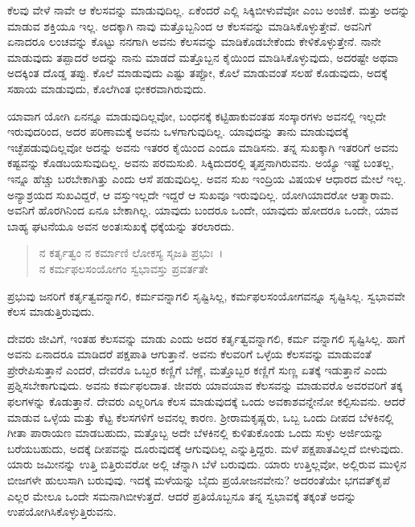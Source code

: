 ಕೆಲವು ವೇಳೆ ನಾವೇ ಆ ಕೆಲಸವನ್ನು ಮಾಡುವುದಿಲ್ಲ. ಏಕೆಂದರೆ ಎಲ್ಲಿ ಸಿಕ್ಕಿಬೀಳುವೆವೋ ಎಂಬ ಅಂಜಿಕೆ. ಮತ್ತು ಅದನ್ನು ಮಾಡುವ ಶಕ್ತಿಯೂ ಇಲ್ಲ. ಅದಕ್ಕಾಗಿ ನಾವು ಮತ್ತೊಬ್ಬನಿಂದ ಆ ಕೆಲಸವನ್ನು ಮಾಡಿಸಿಕೊಳ್ಳುತ್ತೇವೆ. ಅವನಿಗೆ ಏನಾದರೂ ಲಂಚವನ್ನು ಕೊಟ್ಟು ನನಗಾಗಿ ಅವನು ಕೆಲಸವನ್ನು ಮಾಡಿಕೊಡಬೇಕೆಂದು ಕೇಳಿಕೊಳ್ಳುತ್ತೇನೆ. ನಾನೇ ಮಾಡುವುದು ತಪ್ಪಾದರೆ ಅದನ್ನು ನಾನು ಮಾಡದೆ ಮತ್ತೊಬ್ಬನ ಕೈಯಿಂದ ಮಾಡಿಸಿಕೊಳ್ಳುವುದು, ಅದರಷ್ಟೇ ಅಥವಾ ಅದಕ್ಕಿಂತ ದೊಡ್ಡ ತಪ್ಪು. ಕೊಲೆ ಮಾಡುವುದು ಎಷ್ಟು ತಪ್ಪೋ, ಕೊಲೆ ಮಾಡುವಂತೆ ಸಲಹೆ ಕೊಡುವುದು, ಅದಕ್ಕೆ ಸಹಾಯ ಮಾಡುವುದು, ಕೊಲೆಗಿಂತ ಭೀಕರವಾಗಿರುವುದು.

ಯಾವಾಗ ಯೋಗಿ ಏನನ್ನೂ ಮಾಡುವುದಿಲ್ಲವೋ, ಬಂಧನಕ್ಕೆ ಕಟ್ಟಿಹಾಕುವಂತಹ ಸಂಸ್ಕಾರಗಳು ಅವನಲ್ಲಿ ಇಲ್ಲದೇ ಇರುವುದರಿಂದ, ಅದರ ಪರಿಣಾಮಕ್ಕೆ ಅವನು ಒಳಗಾಗುವುದಿಲ್ಲ. ಯಾವುದನ್ನು ತಾನು ಮಾಡುವುದಕ್ಕೆ ಇಚ್ಛೆಪಡುವುದಿಲ್ಲವೋ ಅದನ್ನು ಅವನು ಇತರರ ಕೈಯಿಂದ ಎಂದೂ ಮಾಡಿಸನು. ತನ್ನ ಸುಖಕ್ಕಾಗಿ ಇತರರಿಗೆ ಅವನು ಕಷ್ಟವನ್ನು ಕೊಡಬಯಸುವುದಿಲ್ಲ. ಅವನು ಪರಮಸುಖಿ. ಸಿಕ್ಕಿದುದರಲ್ಲಿ ತೃಪ್ತನಾಗಿರುವನು. ಅಯ್ಯೊ ಇಷ್ಟೆ ಬಂತಲ್ಲ, ಇನ್ನೂ ಹೆಚ್ಚು ಬರಬೇಕಾಗಿತ್ತು ಎಂದು ಆಸೆ ಪಡುವುದಿಲ್ಲ. ಅವನ ಸುಖ ಇಂದ್ರಿಯ ವಿಷಯಳ ಆಧಾರದ ಮೇಲೆ ಇಲ್ಲ. ಅನ್ಯಾಶ್ರಯದ ಸುಖವಿದ್ದರೆ, ಆ ವಸ್ತುಇಲ್ಲದೇ ಇದ್ದರೆ ಆ ಸುಖವೂ ಇರುವುದಿಲ್ಲ. ಯೋಗಿಯಾದರೋ ಆತ್ಮಾರಾಮ. ಅವನಿಗೆ ಹೊರಗಿನಿಂದ ಏನೂ ಬೇಕಾಗಿಲ್ಲ. ಯಾವುದು ಬಂದರೂ ಒಂದೇ, ಯಾವುದು ಹೋದರೂ ಒಂದೇ, ಯಾವ ಬಾಹ್ಯ ಘಟನೆಯೂ ಅವನ ಅಂತಃಸುಖಕ್ಕೆ ಧಕ್ಕೆಯನ್ನು ತರಲಾರದು.

\begin{verse}
ನ ಕರ್ತೃತ್ವಂ ನ ಕರ್ಮಾಣಿ ಲೋಕಸ್ಯ ಸೃಜತಿ ಪ್ರಭುಃ~।\\ನ ಕರ್ಮಫಲಸಂಯೋಗಂ ಸ್ವಭಾವಸ್ತು ಪ್ರವರ್ತತೇ 
\end{verse}

{\small ಪ್ರಭುವು ಜನರಿಗೆ ಕರ್ತೃತ್ವವನ್ನಾಗಲಿ, ಕರ್ಮವನ್ನಾಗಲಿ ಸೃಷ್ಟಿಸಿಲ್ಲ, ಕರ್ಮಫಲಸಂಯೋಗವನ್ನೂ ಸೃಷ್ಟಿಸಿಲ್ಲ. ಸ್ವಭಾವವೇ ಕೆಲಸ ಮಾಡುತ್ತಿರುವುದು.}

ದೇವರು ಜೀವಿಗೆ, ಇಂತಹ ಕೆಲಸವನ್ನು ಮಾಡು ಎಂದು ಅದರ ಕರ್ತೃತ್ವವನ್ನಾಗಲಿ, ಕರ್ಮ ವನ್ನಾಗಲಿ ಸೃಷ್ಟಿಸಿಲ್ಲ. ಹಾಗೆ ಅವನು ಏನಾದರೂ ಮಾಡಿದರೆ ಪಕ್ಷಪಾತಿ ಆಗುತ್ತಾನೆ. ಅವನು ಕೆಲವರಿಗೆ ಒಳ್ಳೆಯ ಕೆಲಸವನ್ನು ಮಾಡುವಂತೆ ಪ್ರೇರೇಪಿಸುತ್ತಾನೆ ಎಂದರೆ, ದೇವರೊ ಒಬ್ಬರ ಕಣ್ಣಿಗೆ ಬೆಣ್ಣೆ, ಮತ್ತೊಬ್ಬರ ಕಣ್ಣಿಗೆ ಸುಣ್ಣ ಏತಕ್ಕೆ ಇಡುತ್ತಾನೆ ಎಂದು ಪ್ರಶ್ನಿಸಬೇಕಾಗುವುದು. ಅವನು ಕರ್ಮಫಲದಾತ. ಜೀವರು ಯಾವಯಾವ ಕೆಲಸವನ್ನು ಮಾಡುವರೊ ಅವರವರಿಗೆ ತಕ್ಕ ಫಲಗಳನ್ನು ಕೊಡುತ್ತಾನೆ. ದೇವರು ಎಲ್ಲರಿಗೂ ಕೆಲಸ ಮಾಡುವುದಕ್ಕೆ ಒಂದು ಅವಕಾಶವನ್ನೇನೋ ಕಲ್ಪಿಸುವನು. ಆದರೆ ಮಾಡುವ ಒಳ್ಳೆಯ ಮತ್ತು ಕೆಟ್ಟ ಕೆಲಸಗಳಿಗೆ ಅವನಲ್ಲ ಕಾರಣ. ಶ‍್ರೀರಾಮಕೃಷ್ಣರು, ಒಬ್ಬ ಒಂದು ದೀಪದ ಬೆಳಕಿನಲ್ಲಿ ಗೀತಾ ಪಾರಾಯಣ ಮಾಡಬಹುದು, ಮತ್ತೊಬ್ಬ ಅದೇ ಬೆಳಕಿನಲ್ಲಿ ಕುಳಿತುಕೊಂಡು ಒಂದು ಸುಳ್ಳು ಅರ್ಜಿಯನ್ನು ಬರೆಯಬಹುದು, ಅದಕ್ಕೆ ದೀಪವನ್ನು ದೂರುವುದಕ್ಕೆ ಆಗುವುದಿಲ್ಲ ಎನ್ನುತ್ತಿದ್ದರು. ಮಳೆ ಪಕ್ಷಪಾತವಿಲ್ಲದೆ ಬೀಳುವುದು. ಯಾರು ಜಮೀನನ್ನು ಉತ್ತಿ ಬಿತ್ತಿರುವರೋ ಅಲ್ಲಿ ಚೆನ್ನಾಗಿ ಬೆಳೆ ಬರುವುದು. ಯಾರು ಉತ್ತಿಲ್ಲವೋ, ಅಲ್ಲಿರುವ ಮುಳ್ಳಿನ ಬೀಜಗಳೇ ಹುಲುಸಾಗಿ ಬರುವುವು. ಇದಕ್ಕೆ ಮಳೆಯನ್ನು ಬೈದು ಪ್ರಯೋಜನವೇನು? ಅದರಂತೆಯೇ ಭಗವತ್​ಕೃಪೆ ಎಲ್ಲರ ಮೇಲೂ ಒಂದೇ ಸಮನಾಗಿಬೀಳುತ್ತದೆ. ಆದರೆ ಪ್ರತಿಯೊಬ್ಬನೂ ತನ್ನ ಸ್ವಭಾವಕ್ಕೆ ತಕ್ಕಂತೆ ಅದನ್ನು ಉಪಯೋಗಿಸಿಕೊಳ್ಳುತ್ತಿರುವನು.

